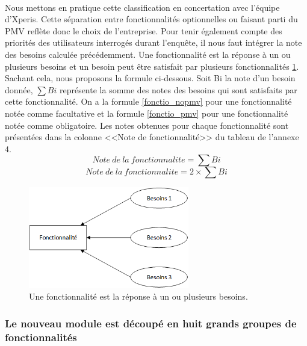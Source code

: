 			\paragraph{}%
			Nous mettons en pratique cette classification en concertation avec l'équipe
			d'Xperis. Cette séparation entre fonctionnalités optionnelles ou faisant
			parti du PMV reflète donc le choix de l'entreprise.
			Pour tenir également compte des priorités des utilisateurs interrogés durant
			l'enquête, il nous faut intégrer la note des besoins calculée précédemment.
			Une fonctionnalité est la réponse à un ou plusieurs besoins et un besoin peut
			être satisfait par plusieurs fonctionnalités \ref{mapping_besoins}. Sachant
			cela, nous proposons la formule ci-dessous.
			Soit Bi la note d'un besoin donnée, \begin{math}\sum Bi\end{math} représente
			la somme des notes des besoins qui sont satisfaits par cette fonctionnalité.
			On a la formule \ref{fonctio_nopmv} pour une fonctionnalité notée comme
			facultative et la formule \ref{fonctio_pmv} pour une fonctionnalité notée
			comme obligatoire. Les notes obtenues pour chaque fonctionnalité sont
			présentées dans la colonne <<Note de fonctionnalité>> du tableau de l'annexe
			4.
			\begin{equation}
				\label{fonctio_nopmv}
				Note\ de\ la\ fonctionnalite=\sum Bi
			\end{equation}
			\begin{equation}
				\label{fonctio_pmv}
				Note\ de\ la\ fonctionnalite=2\times \sum Bi
			\end{equation}
			\begin{figure}[H]
				\centering
				\includegraphics[width=7cm]{../img/part2/mapping_besoins.png}
				\caption{\label{mapping_besoins} Une fonctionnalité est la réponse à un ou
				plusieurs besoins.}
			\end{figure}
			
		\subsubsection{Le nouveau module est découpé en huit grands groupes de
		fonctionnalités}
